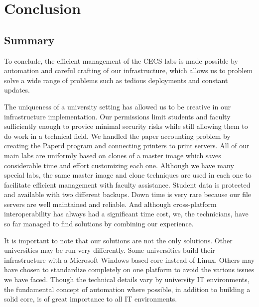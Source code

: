 \chapter{Conclusion} \label{ch:conclusion}
\section{Summary} \label{sec:summary}
To conclude, the efficient management of the CECS labs is made possible by automation and careful crafting of our infrastructure, which allows us to problem solve a wide range of problems such as tedious deployments and constant updates.  

The uniqueness of a university setting has allowed us to be creative in our infrastructure implementation.  Our permissions limit students and faculty sufficiently enough to provice minimal security risks while still allowing them to do work in a technical field.  We handled the paper accounting problem by creating the Paperd program and connecting printers to print servers.  All of our main labs are uniformly based on clones of a master image which saves considerable time and effort customizing each one.  Although we have many special labs, the same master image and clone techniques are used in each one to facilitate efficient management with faculty assistance.  Student data is protected and available with two different backups.  Down time is very rare because our file servers are well maintained and reliable.  And although cross-platform interoperability has always had a significant time cost, we, the technicians, have so far managed to find solutions by combining our experience.

It is important to note that our solutions are not the only solutions.  Other universities may be run very differently.  Some universities build their infrastructure with a Microsoft Windows based core instead of Linux.  Others may have chosen to standardize completely on one platform to avoid the various issues we have faced.  Though the technical details vary by university IT environments, the fundamental concept of automation where possible, in addition to building a solid core, is of great importance to all IT environments. 
